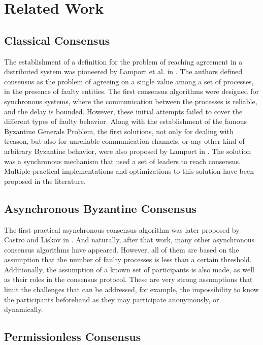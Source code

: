 \documentclass[journal]{IEEEtran}
\begin{document}
\section{Related Work}

\subsection{Classical Consensus}

The establishment of a definition for the problem of reaching agreement in a distributed 
system was pioneered by Lamport et al. in \cite{pease1980reaching}. 
The authors defined consensus as the problem of agreeing on a single value among a set of processes, 
in the presence of faulty entities. The first consensus algorithms were designed for 
synchronous systems, where the communication between the processes is reliable, and the 
delay is bounded. However, these initial attempts failed to cover the different types of 
faulty behavior. Along with the establishment of the famous Byzantine Generals Problem, 
the first solutions, not only for dealing with treason, but also for unreliable communication 
channels, or any other kind of arbitrary Byzantine behavior, were 
also proposed by Lamport in \cite{lamport2019byzantine,lamport1983weak}. The solution was a synchronous 
mechanism that used a set of leaders to reach consensus. Multiple practical implementations 
and optimizations to this solution have been proposed in the literature. 

\subsection{Asynchronous Byzantine Consensus}

The first practical asynchronous consensus algorithm was later proposed by Castro and Liskov in \cite{castro1999practical}. 
And naturally, after that work, many other asynchronous consensus algorithms have appeared. 
However, all of them are based on the assumption that the number of faulty processes is less than 
a certain threshold. Additionally, the assumption of a known set of participants is also made, as well as their roles 
in the consensus protocol. These are very strong assumptions that limit the challenges that can be addressed, 
for example, the impossibility to know the participants beforehand as they may participate anonymously, or dynamically.

\subsection{Permissionless Consensus}
\end{document}
